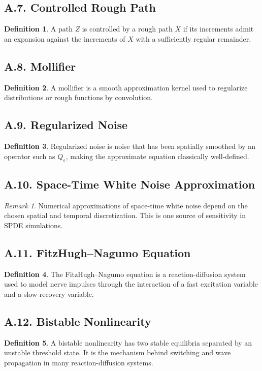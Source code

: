 \documentclass[11pt]{article}
\theoremstyle{definition}
\newtheorem{definition}{Definition}
\theoremstyle{remark}
\newtheorem{remark}{Remark}
\begin{document}
\subsection*{A.7. Controlled Rough Path}
\begin{definition}
A path \(Z\) is controlled by a rough path \(X\) if its increments admit an expansion against the increments of \(X\) with a sufficiently regular remainder.
\end{definition}

\subsection*{A.8. Mollifier}
\begin{definition}
A mollifier is a smooth approximation kernel used to regularize distributions or rough functions by convolution.
\end{definition}

\subsection*{A.9. Regularized Noise}
\begin{definition}
Regularized noise is noise that has been spatially smoothed by an operator such as \(Q_\varepsilon\), making the approximate equation classically well-defined.
\end{definition}

\subsection*{A.10. Space-Time White Noise Approximation}
\begin{remark}
Numerical approximations of space-time white noise depend on the chosen spatial and temporal discretization. This is one source of sensitivity in SPDE simulations.
\end{remark}

\subsection*{A.11. FitzHugh--Nagumo Equation}
\begin{definition}
The FitzHugh--Nagumo equation is a reaction-diffusion system used to model nerve impulses through the interaction of a fast excitation variable and a slow recovery variable.
\end{definition}

\subsection*{A.12. Bistable Nonlinearity}
\begin{definition}
A bistable nonlinearity has two stable equilibria separated by an unstable threshold state. It is the mechanism behind switching and wave propagation in many reaction-diffusion systems.
\end{definition}
\end{document}
